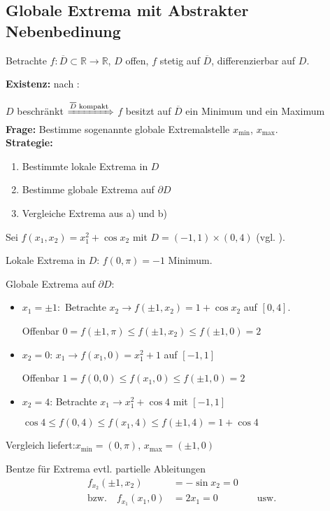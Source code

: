 \subsection{Globale Extrema mit Abstrakter Nebenbedinung}
Betrachte $f:\overline{D}\subset\mathbb{R}\to\mathbb{R}$, $D$ offen, $f$ stetig auf $\overline{D}$, \gls{differenzierbar} auf $D$.

\textbf{Existenz:} nach :
	
	$D$ beschränkt $\xRightarrow{\text{$\overline{D}$ kompakt}}$ $f$ besitzt auf $\overline{D}$ ein Minimum und ein Maximum\\

\textbf{Frage:} Bestimme sogenannte globale Extremalstelle $x_{\min}$, $x_{\max}$. \\

\textbf{Strategie:}\\
	\begin{enumerate}[label={\alph*)},topsep=\dimexpr-\baselineskip/2\relax]
		\item Bestimmte lokale Extrema in $D$
		\item Bestimme globale Extrema auf $\partial D$
		\item Vergleiche Extrema aus a) und b)
	\end{enumerate}

\begin{example}
	Sei $f(x_1, x_2) = x_1^2 + \cos x_2$ mit $D=(-1,1)\times(0,4)$ (vgl. ).
	
	Lokale Extrema in $D$: $f(0,\pi) = -1$ Minimum.
	
	Globale Extrema auf $\partial D$:\begin{itemize}
		\item $x_1 = \pm 1:$ Betrachte $x_2 \to f(\pm 1, x_2) = 1 + \cos x_2$ auf $[0,4]$.
		
		Offenbar $0 = f(\pm 1, \pi) \le f(\pm 1, x_2) \le f(\pm 1, 0) = 2$
		
		\item $x_2=0$: $x_1\to f(x_1, 0) = x_1^2 + 1$ auf $[-1,1]$
		
		Offenbar $1=f(0,0) \le f(x_1,0)\le f(\pm 1, 0) = 2$
		
		\item $x_2 = 4$: Betrachte $x_1\to x_1^2+\cos 4$ mit $[-1,1]$
		
		$\cos 4 \le f(0,4) \le f(x_1, 4) \le f(\pm 1, 4) = 1 + \cos 4$
	\end{itemize}
	Vergleich liefert:$ x_{\min}=(0,\pi)$, $x_{\max} = (\pm 1,0)$
	
	\begin{underlinedenvironment}[Hinweis]
		Bentze für Extrema evtl. partielle Ableitungen \begin{align*}
			f_{x_2}(\pm 1, x_2) &= -\sin x_2 = 0 \\
			\text{bzw.}\quad f_{x_1}(x_1, 0) &= 2x_1 = 0 \qquad\qquad\text{usw.}
		\end{align*}
	\end{underlinedenvironment}
\end{example}